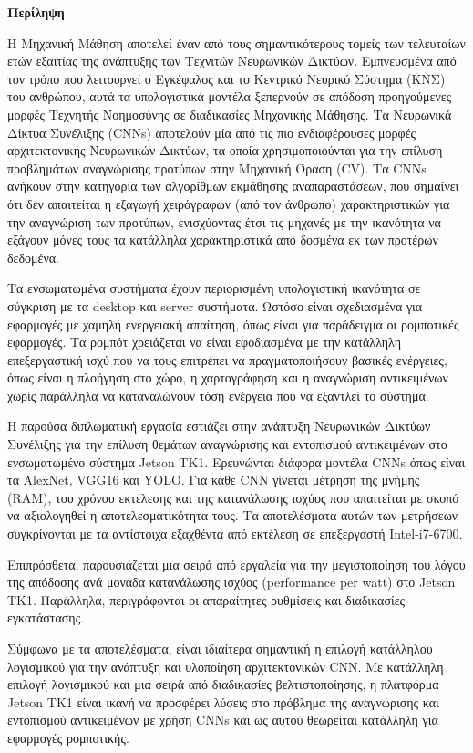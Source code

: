 \begin{center}
  \centering

  \vspace{0.5cm}
  \centering
  \textbf{\Large{Περίληψη}}

  \vspace{1cm}

\end{center}

  Η Μηχανική Μάθηση αποτελεί έναν από τους σημαντικότερους τομείς των τελευταίων
  ετών εξαιτίας της ανάπτυξης των Τεχνιτών Νευρωνικών Δικτύων.
  Εμπνευσμένα από τον τρόπο που λειτουργεί ο Εγκέφαλος και το Κεντρικό Νευρικό Σύστημα (ΚΝΣ)
  του ανθρώπου, αυτά τα υπολογιστικά μοντέλα ξεπερνούν σε απόδοση προηγούμενες μορφές Τεχνητής Νοημοσύνης
  σε διαδικασίες Μηχανικής Μάθησης.
  Τα Νευρωνικά Δίκτυα Συνέλιξης (CNNs) αποτελούν μία από τις πιο ενδιαφέρουσες μορφές αρχιτεκτονικής
  Νευρωνικών Δικτύων, τα οποία χρησιμοποιούνται για την επίλυση προβλημάτων αναγνώρισης προτύπων
  στην Μηχανική Όραση (CV). Τα CNNs ανήκουν στην κατηγορία των αλγορίθμων εκμάθησης αναπαραστάσεων, που
  σημαίνει ότι δεν απαιτείται η εξαγωγή χειρόγραφων (από τον άνθρωπο) χαρακτηριστικών για την αναγνώριση των
  προτύπων, ενισχύοντας έτσι τις μηχανές με την ικανότητα να εξάγουν μόνες τους
  τα κατάλληλα χαρακτηριστικά από δοσμένα εκ των προτέρων δεδομένα.

  Τα ενσωματωμένα συστήματα έχουν περιορισμένη υπολογιστική ικανότητα σε σύγκριση με τα desktop και server συστήματα.
  Ωστόσο είναι σχεδιασμένα για εφαρμογές με χαμηλή ενεργειακή απαίτηση, όπως
  είναι για παράδειγμα οι ρομποτικές εφαρμογές. Τα ρομπότ χρειάζεται να είναι εφοδιασμένα με την κατάλληλη 
  επεξεργαστική ισχύ που να τους επιτρέπει να πραγματοποιήσουν
  βασικές ενέργειες, όπως είναι η πλοήγηση στο χώρο,
  η χαρτογράφηση και η αναγνώριση αντικειμένων χωρίς παράλληλα να καταναλώνουν
  τόση ενέργεια που να εξαντλεί το σύστημα.

  Η παρούσα διπλωματική εργασία εστιάζει στην ανάπτυξη Νευρωνικών Δικτύων Συνέλιξης για την επίλυση θεμάτων αναγνώρισης
  και εντοπισμού αντικειμένων στο ενσωματωμένο σύστημα Jetson TK1.
  Ερευνώνται διάφορα μοντέλα CNNs όπως είναι τα AlexNet, VGG16 και YOLO. Για κάθε CNN γίνεται
  μέτρηση της μνήμης (RAM), του χρόνου εκτέλεσης και της κατανάλωσης ισχύος που απαιτείται με
  σκοπό να αξιολογηθεί η αποτελεσματικότητα τους. Τα αποτελέσματα αυτών των
  μετρήσεων συγκρίνονται με τα αντίστοιχα εξαχθέντα από εκτέλεση σε επεξεργαστή  Intel-i7-6700.

  Επιπρόσθετα, παρουσιάζεται μια σειρά από εργαλεία για την μεγιστοποίηση του λόγου της απόδοσης
  ανά μονάδα κατανάλωσης ισχύος (performance per watt) στο Jetson TK1.
  Παράλληλα, περιγράφονται οι απαραίτητες ρυθμίσεις και διαδικασίες εγκατάστασης.

  Σύμφωνα με τα αποτελέσματα, είναι ιδιαίτερα σημαντική η επιλογή κατάλληλου λογισμικού για
  την ανάπτυξη και υλοποίηση αρχιτεκτονικών CNN. Με κατάλληλη επιλογή λογισμικού και
  μια σειρά από διαδικασίες βελτιστοποίησης, η πλατφόρμα Jetson TK1 είναι ικανή να προσφέρει λύσεις
  στο πρόβλημα της αναγνώρισης και εντοπισμού αντικειμένων με χρήση CNNs και ως αυτού θεωρείται
  κατάλληλη για εφαρμογές ρομποτικής.

